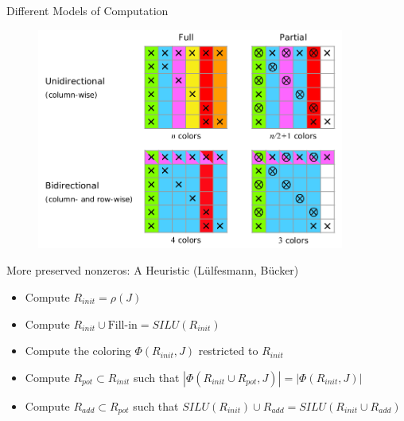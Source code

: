 \documentclass{beamer}
\begin{document}
\begin{frame}{Different Models of Computation}
\begin{figure}
\centering
\includegraphics[width=0.9\textwidth]{fullvsPart}
\end{figure}
\end{frame}

\begin{frame}{More preserved nonzeros: A Heuristic}
(L{\"u}lfesmann, B{\"u}cker)
\begin{itemize}
\item Compute $R_{init} = \rho(J)$
\item Compute $R_{init} \cup \text{Fill-in} = SILU(R_{init})$
\item Compute the coloring $\Phi (R_{init}, J)$ restricted to $R_{init}$
\item Compute $R_{pot} \subset R_{init}$ such that $|\Phi(R_{init}\cup R_{pot},J)| = |\Phi (R_{init}, J)|$
\item Compute $R_{add} \subset R_{pot}$ such that $SILU(R_{init})\cup R_{add} = SILU(R_{init}\cup R_{add})$
\end{itemize}
\end{frame}
\end{document}
